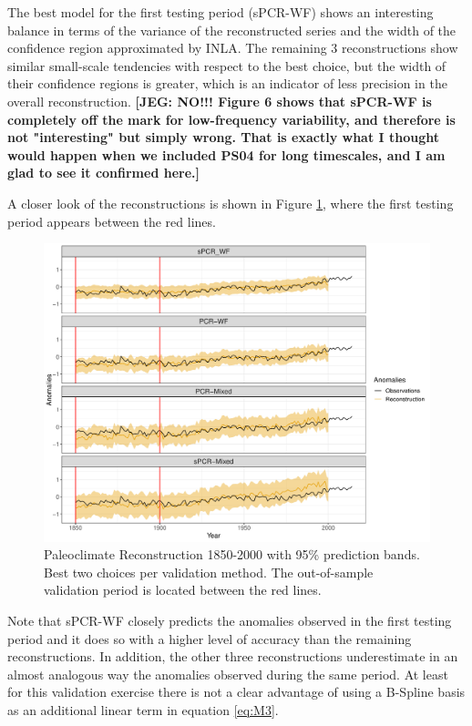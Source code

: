 \documentclass[12pt]{amsart}
\theoremstyle{plain}
\theoremstyle{definition}
\theoremstyle{remark}
\newcommand{\jeg}[1]{\color{ProcessBlue}\textbf{[JEG: #1]}\normalcolor}
\begin{document}
The best model for the first testing period (sPCR-WF) shows an interesting
balance in terms of the variance of the reconstructed series and the width of
the confidence region approximated by INLA. The remaining 3 reconstructions show similar small-scale tendencies with respect to the best choice, but the width of their confidence regions
is greater, which is an indicator of less precision in the overall
reconstruction. \jeg{NO!!! Figure 6 shows that sPCR-WF is completely off the mark for low-frequency variability, and therefore is not "interesting" but simply wrong. That is exactly what I thought would happen when we included PS04 for long timescales, and I am glad to see it confirmed here.}


A closer look of the reconstructions is shown in Figure
\ref{fig:paleo19001}, where the first testing period appears between the red lines.
\begin{figure}
  \centering
  \includegraphics[scale=0.55]{Rec1900_Final}
  \caption{Paleoclimate Reconstruction 1850-2000 with 95\%
    prediction bands. Best two choices per validation method. The out-of-sample validation period is
    located between the red lines.}
  \label{fig:paleo19001}
\end{figure}
Note that sPCR-WF closely predicts the anomalies observed in the first testing
period and it does so with a higher level of accuracy than the remaining
reconstructions. In addition, the other three reconstructions underestimate in
an almost analogous way the anomalies observed during the same period. At least
for this validation exercise there is not a clear advantage of using a B-Spline
basis as an additional linear term in equation \eqref{eq:M3}.
\end{document}
